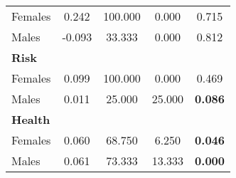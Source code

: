 \begin{tabular}{lcccc}
\quad Females &     0.242 &   100.000 &     0.000  &     0.715 \\
\quad Males &    -0.093 &    33.333  &     0.000 & 0.812 \\  
 \midrule
\textbf{Risk}  & & & & \\
 \quad Females &     0.099 &   100.000 &     0.000  &     0.469 \\
 \quad Males &     0.011 &    25.000  &    25.000 &     \textbf{0.086} \\  
 \midrule
\textbf{Health}   & & & & \\
 \quad Females &     0.060   &    68.750 &     6.250 &     \textbf{0.046} \\
 \quad Males &     0.061  &    73.333 &    13.333  &     \textbf{0.000} \\  
\bottomrule
\end{tabular}

